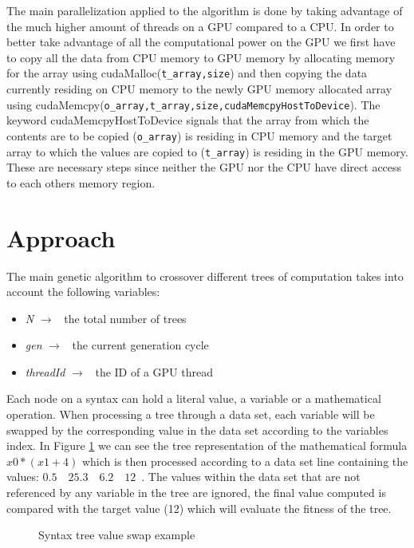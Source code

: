 \documentclass[runningheads]{llncs}
\begin{document}
The main parallelization applied to the algorithm is done by taking advantage of the much higher amount of threads on a GPU compared to a CPU. In order to better take advantage of all the computational power on the GPU we first have to copy all the data from CPU memory to GPU memory by allocating memory for the array using cudaMalloc(\texttt{t\_array,size}) and then copying the data currently residing on CPU memory to the newly GPU memory allocated array using cudaMemcpy(\texttt{o\_array,t\_array,size,cudaMemcpyHostToDevice}). The keyword cudaMemcpyHostToDevice signals that the array from which the contents are to be copied (\texttt{o\_array}) is residing in CPU memory and the target array to which the values are copied to (\texttt{t\_array}) is residing in the GPU memory. These are necessary steps since neither the GPU nor the CPU have direct access to each others memory region.

\section{Approach}
The main genetic algorithm to crossover different trees of computation takes into account the following variables:
\begin{itemize}
	\item \textit{N} $\rightarrow$ \ the total number of trees
	\item \textit{gen} $\rightarrow$ \ the current generation cycle
	\item \textit{threadId} $\rightarrow$ \ the ID of a GPU thread
\end{itemize}

Each node on a syntax can hold a literal value, a variable or a mathematical operation. When processing a tree through a data set, each variable will be swapped by the corresponding value in the data set according to the variables index. In Figure \ref{syntree} we can see the tree representation of the mathematical formula $x0 * (x1+4)$ which is then processed according to a data set line containing the values: $0.5\quad 25.3\quad 6.2\quad 12$\ . The values within the data set that are not referenced by any variable in the tree are ignored, the final value computed is compared with the target value (12) which will evaluate the fitness of the tree.

\begin{figure}
\hfil
{}
\hfil
\caption{Syntax tree value swap example}
\label{syntree}
\end{figure}
\end{document}

